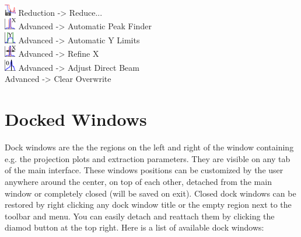 \begin{description}
    \item[{\includegraphics[width=0.5cm]{../../icons/reduce.png} Reduction -> Reduce...}] 

   \item[{\includegraphics[width=0.5cm]{../../icons/findXauto.png} Advanced -> Automatic Peak Finder}] 
   \item[{\includegraphics[width=0.5cm]{../../icons/limitYauto.png} Advanced -> Automatic Y Limits}] 
   \item[{\includegraphics[width=0.5cm]{../../icons/fitXPos.png} Advanced -> Refine X}] 
   \item[{\includegraphics[width=0.5cm]{../../icons/tthZero.png} Advanced -> Adjust Direct Beam}] 
   \item[{ Advanced -> Clear Overwrite}] 
  \end{description}

\section{Docked Windows}
  Dock windows are the the regions on the left and right of the window containing e.g. the projection plots and extraction parameters. They are visible on any tab of the main interface.
  These windows positions can be customized by the user anywhere around the center, on top of each other, detached from the main window or completely closed (will be saved on exit). Closed dock windows can be restored by right clicking any dock window title or the empty region next to the toolbar and menu. You can easily detach and reattach them by clicking the diamod button at the top right.
  Here is a list of available dock windows:
  
